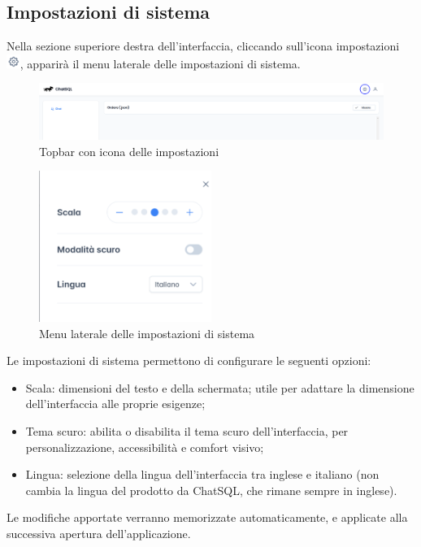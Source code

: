 \subsection{Impostazioni di sistema}
Nella sezione superiore destra dell'interfaccia, cliccando sull'icona impostazioni \includegraphics[height=1.2em]{assets/settings_icon.png}, apparirà il menu laterale delle impostazioni di sistema.
\begin{figure}[H]
  \centering
  \includegraphics[width=1\textwidth]{assets/settings_topbar.png}
  \caption{Topbar con icona delle impostazioni}
\end{figure}
\begin{figure}[H]
  \centering
  \includegraphics[width=0.50\textwidth]{assets/menu_config.png}
  \caption{Menu laterale delle impostazioni di sistema}
\end{figure}
\par Le impostazioni di sistema permettono di configurare le seguenti opzioni:
\begin{itemize}
  \item Scala: dimensioni del testo e della schermata; utile per adattare la dimensione dell'interfaccia alle proprie esigenze;
  \item Tema scuro: abilita o disabilita il tema scuro dell'interfaccia, per personalizzazione, accessibilità e comfort visivo;
  \item Lingua: selezione della lingua dell'interfaccia tra inglese e italiano (non cambia la lingua del  prodotto da ChatSQL, che rimane sempre in inglese).
\end{itemize}
\par Le modifiche apportate verranno memorizzate automaticamente, e applicate alla successiva apertura dell'applicazione.

